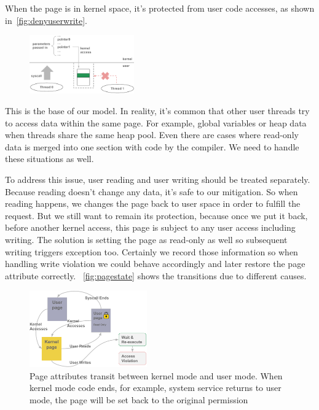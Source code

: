 When the page is in kernel space, it's protected from user code accesses, as shown in~\autoref{fig:denyuserwrite}.

\begin{figure}[th]
  \includegraphics[width=0.40\textwidth]{figures/denyuserwrite}
  \centering
  \caption{}
  \label{fig:denyuserwrite}
\end{figure}


This is the base of our model. In reality, it's common that other user threads try to access data within the same page. For example, global variables or heap data when threads share the same heap pool. Even there are cases where read-only data is merged into one section with code by the compiler. We need to handle these situations as well.

To address this issue, user reading and user writing should be treated separately. Because reading doesn't change any data, it's safe to our mitigation. So when reading happens, we changes the page back to user space in order to fulfill the request. But we still want to remain its protection, because once we put it back, before another kernel access, this page is subject to any user access including writing. The solution is setting the page as read-only as well so subsequent writing triggers exception too. Certainly we record those information so when handling write violation we could behave accordingly and later restore the page attribute correctly. ~\autoref{fig:pagestate} shows the transitions due to different causes. 


\begin{figure}[th]
  \includegraphics[width=0.45\textwidth]{figures/pagestate}
  \centering
  \caption{Page attributes transit between kernel mode and user mode. When kernel mode code ends, for example, system service returns to user mode, the page will be set back to the original permission}
  \label{fig:pagestate}
\end{figure}


